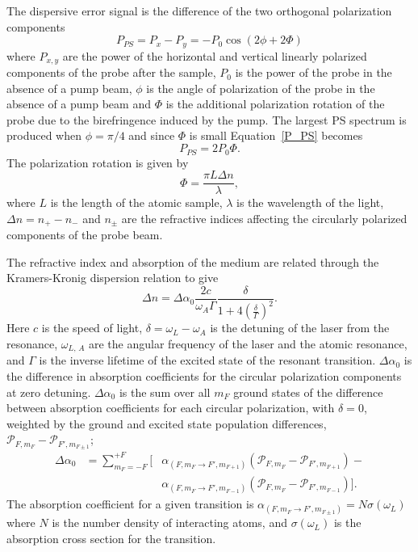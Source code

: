 The dispersive error signal is the difference of the two orthogonal polarization components~\cite{pearman_polarization_2002, hughes_polarization_2009}
\begin{equation}
P_{PS} = P_x-P_y = -P_0 \cos(2\phi+2\Phi)\label{P_PS}
\end{equation}
where $P_{x,y}$ are the power of the horizontal and vertical linearly polarized components of the probe after the sample, $P_0$ is the power of the probe in the absence of a pump beam, $\phi$ is the angle of polarization of the probe in the absence of a pump beam and $\Phi$ is the additional polarization rotation of the probe due to the birefringence induced by the pump.
The largest PS spectrum is produced when $\phi=\pi/4$ and since $\Phi$ is small Equation~\ref{P_PS} becomes
\begin{equation}
P_{PS} = 2P_0 \Phi.
\end{equation}
The polarization rotation is given by
\begin{equation}
\Phi = \frac{\pi L \Delta n}{\lambda},
\end{equation}
where $L$ is the length of the atomic sample, $\lambda$ is the wavelength of the light, $\Delta n = n_+ - n_-$ and $n_\pm$ are the refractive indices affecting the circularly polarized components of the probe beam.

The refractive index and absorption of the medium are related through the Kramers-Kronig dispersion relation to give~\cite{demtroder_laser_2003}
\begin{equation}
\Delta n = \Delta\alpha_0 \frac{2c}{\omega_A \Gamma}\frac{\delta}{1+4\left(\frac{\delta}{\Gamma}\right)^2}.\label{result}
\end{equation}
Here $c$ is the speed of light, $\delta=\omega_L-\omega_A$ is the detuning of the laser from the resonance, $\omega_{L,\,A}$ are the angular frequency of the laser and the atomic resonance, and $\Gamma$ is the inverse lifetime of the excited state of the resonant transition.
$\Delta\alpha_0$ is the difference in absorption coefficients for the circular polarization components at zero detuning.
$\Delta\alpha_0$ is the sum over all $m_F$ ground states of the difference between absorption coefficients for each circular polarization, with $\delta=0$, weighted by the ground and excited state population differences, $\mathcal{P}_{F,m_F}-\mathcal{P}_{F',m_{F\pm1}}$;
\begin{eqnarray}
\Delta\alpha_0 &= \sum_{m_F=-F}^{+F} \Big[&\alpha_{(F,m_F\rightarrow F',m_{F+1})}(\mathcal{P}_{F,m_F}-\mathcal{P}_{F',m_{F+1}})-\nonumber\\
&&\alpha_{(F,m_F\rightarrow F',m_{F-1})}(\mathcal{P}_{F,m_F}-\mathcal{P}_{F',m_{F-1}})\Big].
\end{eqnarray}
The absorption coefficient for a given transition is $\alpha_{(F, m_F\rightarrow F',m_{F\pm1})}=N \sigma(\omega_L)$ where $N$ is the number density of interacting atoms, and $\sigma(\omega_L)$ is the absorption cross section for the transition.

